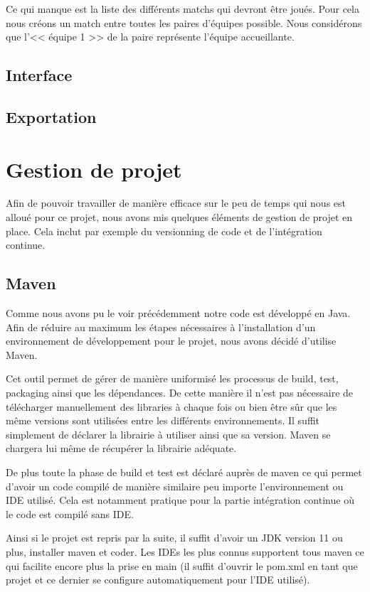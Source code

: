 \documentclass[final, noposter]{polytech/polytech}
\begin{document}
		Ce qui manque est la liste des différents matchs qui devront être joués.
		Pour cela nous créons un match entre toutes les paires d'équipes possible.
		Nous considérons que l'<< équipe 1 >> de la paire représente l'équipe accueillante.
	
	\section{Interface}
	\section{Exportation}

\chapter{Gestion de projet}
	Afin de pouvoir travailler de manière efficace sur le peu de temps qui nous est alloué pour ce projet, nous avons mis quelques éléments de gestion de projet en place.
	Cela inclut par exemple du versionning de code et de l'intégration continue.
	
	\section{Maven\label{sec:maven}}
		Comme nous avons pu le voir précédemment notre code est développé en Java.
		Afin de réduire au maximum les étapes nécessaires à l'installation d'un environnement de développement pour le projet, nous avons décidé d'utilise Maven.
		
		Cet outil permet de gérer de manière uniformisé les processus de build, test, packaging ainsi que les dépendances.
		De cette manière il n'est pas nécessaire de télécharger manuellement des libraries à chaque fois ou bien être sûr que les même versions sont utilisées entre les différents environnements.
		Il suffit simplement de déclarer la librairie à utiliser ainsi que sa version.
		Maven se chargera lui même de récupérer la librairie adéquate.
		
		De plus toute la phase de build et test est déclaré auprès de maven ce qui permet d'avoir un code compilé de manière similaire peu importe l'environnement ou IDE utilisé.
		Cela est notamment pratique pour la partie intégration continue où le code est compilé sans IDE.
		
		Ainsi si le projet est repris par la suite, il suffit d'avoir un JDK version 11 ou plus, installer maven et coder.
		Les IDEs les plus connus supportent tous maven ce qui facilite encore plus la prise en main (il suffit d'ouvrir le pom.xml en tant que projet et ce dernier se configure automatiquement pour l'IDE utilisé).
	
\end{document}
